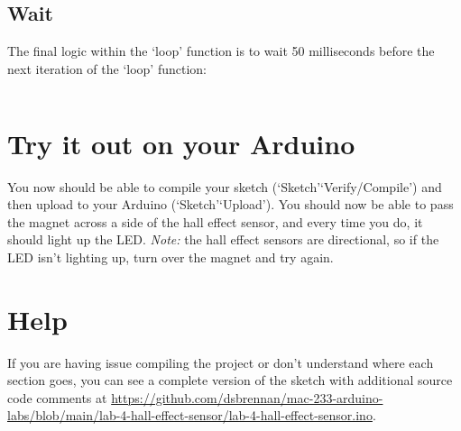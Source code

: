 \documentclass[11pt,a4paper]{article}
\begin{document}
\subsection{Wait}
The final logic within the `loop' function is to wait 50 milliseconds before the next iteration of the `loop' function:\\
\vspace{-1.75em}
\inputminted{arduino}{./src/8-loop-sleep.txt}
\vspace{.75em}

\section*{Try it out on your Arduino}
You now should be able to compile your sketch (`Sketch'\textrightarrow `Verify/Compile') and then upload to your Arduino (`Sketch'\textrightarrow `Upload'). You should now be able to pass the magnet across a side of the hall effect sensor, and every time you do, it should light up the LED. \textit{Note:} the hall effect sensors are directional, so if the LED isn't lighting up, turn over the magnet and try again.

\section*{Help}
If you are having issue compiling the project or don't understand where each section goes, you can see a complete version of the sketch with additional source code comments at \url{https://github.com/dsbrennan/mac-233-arduino-labs/blob/main/lab-4-hall-effect-sensor/lab-4-hall-effect-sensor.ino}.

\begin{center}
\end{center}
\end{document}
